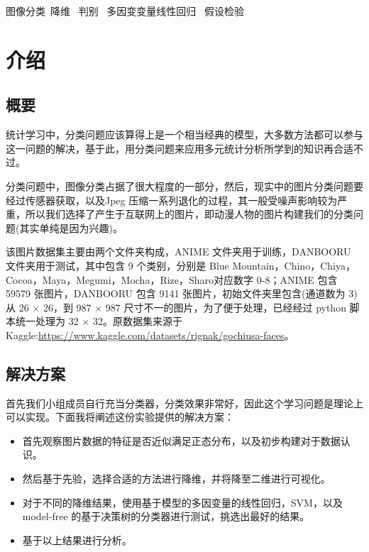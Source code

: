 \documentclass[fleqn]{Paquetes/RevDigMatEduInt}
\begin{document}
	
	\maketitle


\begin{keywords}
	\textcolor{azulTitulos}{图像分类\ 降维 \ 判别 \ 多因变变量线性回归 \ 假设检验}
\end{keywords}

\section{介绍}
\subsection{概要}
统计学习中，分类问题应该算得上是一个相当经典的模型，大多数方法都可以参与这一问题的解决，基于此，用分类问题来应用多元统计分析所学到的知识再合适不过。

分类问题中，图像分类占据了很大程度的一部分，然后，现实中的图片分类问题要经过传感器获取，以及Jpeg 压缩一系列退化的过程，其一般受噪声影响较为严重，所以我们选择了产生于互联网上的图片，即动漫人物的图片构建我们的分类问题(其实单纯是因为兴趣)。

该图片数据集主要由两个文件夹构成，ANIME 文件夹用于训练，DANBOORU 文件夹用于测试，其中包含 9 个类别，分别是 Blue Mountain，Chino，Chiya，Cocoa，Maya，Megumi，Mocha，Rize，Sharo对应数字 0-8；ANIME 包含 59579 张图片，DANBOORU 包含 9141 张图片，初始文件夹里包含(通道数为 $3$)从 26 $\times $ 26，到 987 $\times$ 987 尺寸不一的图片，为了便于处理，已经经过 python 脚本统一处理为 32 $\times $ 32。原数据集来源于 Kaggle:\href{https://www.kaggle.com/datasets/rignak/gochiusa-faces}{https://www.kaggle.com/datasets/rignak/gochiusa-faces}。

\subsection{解决方案}

首先我们小组成员自行充当分类器，分类效果非常好，因此这个学习问题是理论上可以实现。下面我将阐述这份实验提供的解决方案：

\begin{nota}

\begin{itemize}
	\item 首先观察图片数据的特征是否近似满足正态分布，以及初步构建对于数据认识。
	\item 然后基于先验，选择合适的方法进行降维，并将降至二维进行可视化。
	\item 对于不同的降维结果，使用基于模型的多因变量的线性回归，SVM，以及 model-free 的基于决策树的分类器进行测试，挑选出最好的结果。
	\item 基于以上结果进行分析。
\end{itemize}
\end{nota}
\end{document}
